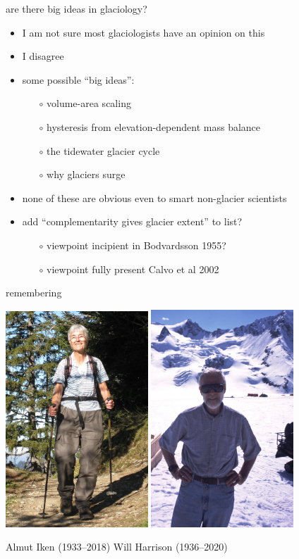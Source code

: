 \documentclass[10pt,hyperref,dvipsnames]{beamer}
\begin{document}
\begin{frame}{are there big ideas in glaciology?}
\begin{itemize}
\item I am not sure most glaciologists have an opinion on this
\item<2-4> I disagree

\bigskip
\item<3-4> some possible ``big ideas'':
    \begin{itemize}
    \item[$\circ$] volume-area scaling
    \item[$\circ$] hysteresis from elevation-dependent mass balance
    \item[$\circ$] the tidewater glacier cycle
    \item[$\circ$] why glaciers surge
    \end{itemize}
\item<3-4> none of these are obvious even to smart non-glacier scientists

\bigskip
\item<4> add ``complementarity gives glacier extent'' to list?
    \begin{itemize}
    \item[$\circ$] viewpoint incipient in Bodvardsson 1955?
    \item[$\circ$] viewpoint fully present Calvo et al 2002
    \end{itemize}
\end{itemize}
\end{frame}


\begin{frame}{remembering}

\includegraphics[width=0.4\textwidth]{figs/Iken_front_crop.jpg} \hfill \includegraphics[width=0.4\textwidth]{figs/Will-by-Truffer.jpg}

Almut Iken (1933--2018) \hfill Will Harrison (1936--2020)
\end{frame}
\end{document}
